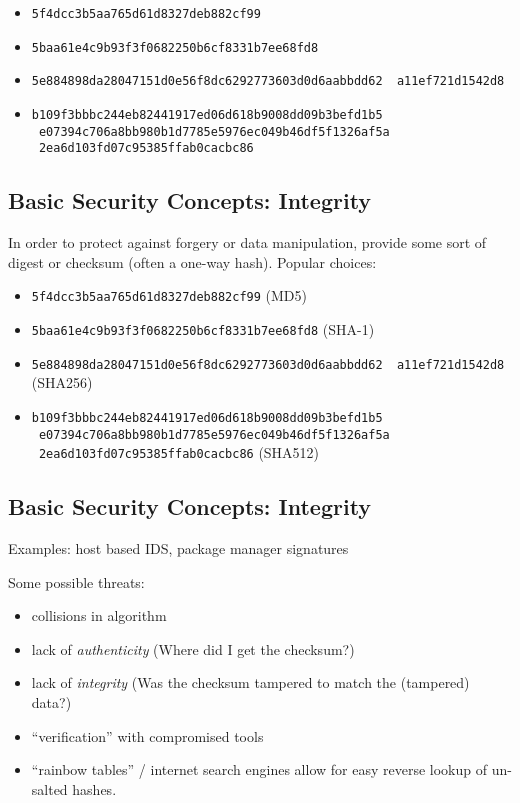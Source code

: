 \documentclass[xga]{xdvislides}
\begin{document}
\begin{itemize}
	\item {\tt 5f4dcc3b5aa765d61d8327deb882cf99}
	\item {\tt 5baa61e4c9b93f3f0682250b6cf8331b7ee68fd8}
	\item {\tt 5e884898da28047151d0e56f8dc6292773603d0d6aabbdd62 \
                   a11ef721d1542d8}
	\item {\tt b109f3bbbc244eb82441917ed06d618b9008dd09b3befd1b5 \
                   e07394c706a8bb980b1d7785e5976ec049b46df5f1326af5a \
                   2ea6d103fd07c95385ffab0cacbc86}
\end{itemize}

\subsection{Basic Security Concepts: Integrity}
In order to protect against forgery or data manipulation, provide some sort of
digest or checksum (often a one-way hash).  Popular choices:

\begin{itemize}
	\item {\tt 5f4dcc3b5aa765d61d8327deb882cf99} (MD5)
	\item {\tt 5baa61e4c9b93f3f0682250b6cf8331b7ee68fd8} (SHA-1)
	\item {\tt 5e884898da28047151d0e56f8dc6292773603d0d6aabbdd62 \
                   a11ef721d1542d8} (SHA256)
	\item {\tt b109f3bbbc244eb82441917ed06d618b9008dd09b3befd1b5 \
                   e07394c706a8bb980b1d7785e5976ec049b46df5f1326af5a \
                   2ea6d103fd07c95385ffab0cacbc86} (SHA512)
\end{itemize}

\subsection{Basic Security Concepts: Integrity}
Examples: host based IDS, package manager signatures

\vspace{.5in}
Some possible threats:
\begin{itemize}
	\item collisions in algorithm
	\item lack of {\em authenticity} (Where did I get the checksum?)
	\item lack of {\em integrity} (Was the checksum tampered to match the (tampered) data?)
	\item ``verification'' with compromised tools
	\item ``rainbow tables'' / internet search engines allow for easy reverse
		lookup of un-salted hashes.
\end{itemize}
\end{document}
